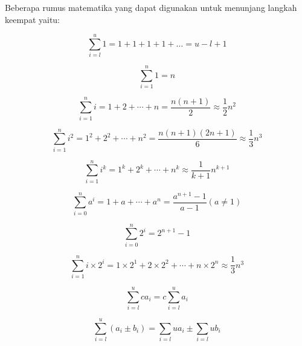 Beberapa rumus matematika yang dapat digunakan untuk menunjang langkah keempat yaitu:

\begin{equation}\label{eq:common-1}
    \sum\limits_{i=l}^u 1 = 1 + 1 + 1 + 1 + \ldots = u - l + 1
\end{equation}

\begin{equation}\label{eq:common-2}
    \sum\limits_{i=1}^n 1 = n
\end{equation}

\begin{equation}\label{eq:common-3}
    \sum\limits_{i=1}^n i = 1 + 2 + \cdots + n = \frac{n(n + 1)}{2} \approx \frac{1}{2}n^2
\end{equation}

\begin{equation}\label{eq:common-4}
    \sum\limits_{i=1}^n i^2 = 1^2 + 2^2 + \cdots + n^2 = \frac{n(n + 1)(2n + 1)}{6} \approx \frac{1}{3}n^3
\end{equation}

\begin{equation}\label{eq:common-5}
    \sum\limits_{i=1}^n i^k = 1^k + 2^k + \cdots + n^k \approx \frac{1}{k + 1}n^{k+1}
\end{equation}

\begin{equation}\label{eq:common-6}
    \sum\limits_{i=0}^n a^i = 1 + a + \cdots + a^n = \frac{a^{n + 1} - 1}{a - 1}(a \neq 1)
\end{equation}

\begin{equation}\label{eq:common-7}
    \sum\limits_{i=0}^n 2^i = 2^{n + 1} - 1
\end{equation}

\begin{equation}\label{eq:common-8}
    \sum\limits_{i=1}^n i \times 2^i = 1 \times 2^1 + 2 \times 2^2 + \cdots + n \times 2^n \approx \frac{1}{3}n^3
\end{equation}

\begin{equation}\label{eq:common-9}
    \sum\limits_{i=l}^u ca_i = c \sum\limits_{i=l}^u a_i
\end{equation}

\begin{equation}\label{eq:common-10}
    \sum\limits_{i=l}^u (a_i \pm b_i) = \sum\limits_{i=l}{u} a_i \pm \sum\limits_{i=l}{u} b_i
\end{equation}


